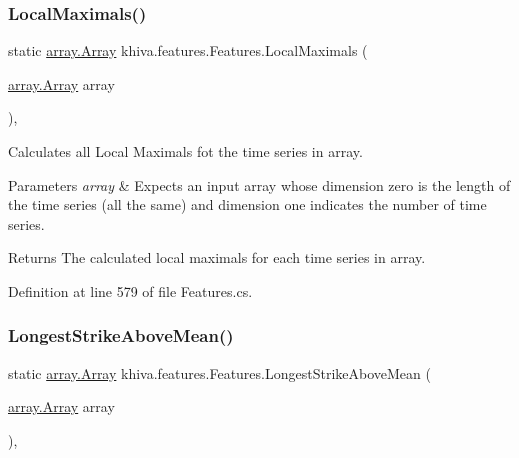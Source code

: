 \mbox{\label{classkhiva_1_1features_1_1_features_aecd48dfe93b9ba4790a53ce80da6b80d}} 
\subsubsection{\texorpdfstring{Local\+Maximals()}{LocalMaximals()}}
{\footnotesize\ttfamily static \mbox{\hyperlink{classkhiva_1_1array_1_1_array}{array.\+Array}} khiva.\+features.\+Features.\+Local\+Maximals (\begin{DoxyParamCaption}\item[{\mbox{\hyperlink{classkhiva_1_1array_1_1_array}{array.\+Array}}}]{array }\end{DoxyParamCaption})\hspace{0.3cm}{\ttfamily [inline]}, {\ttfamily [static]}}



Calculates all Local Maximals fot the time series in array. 


\begin{DoxyParams}{Parameters}
{\em array} & Expects an input array whose dimension zero is the length of the time series (all the same) and dimension one indicates the number of time series.\\
\hline
\end{DoxyParams}
\begin{DoxyReturn}{Returns}
The calculated local maximals for each time series in array.
\end{DoxyReturn}


Definition at line 579 of file Features.\+cs.

\mbox{\label{classkhiva_1_1features_1_1_features_ad57efb15959db76c4e9f7de34b78a7bc}} 
\subsubsection{\texorpdfstring{Longest\+Strike\+Above\+Mean()}{LongestStrikeAboveMean()}}
{\footnotesize\ttfamily static \mbox{\hyperlink{classkhiva_1_1array_1_1_array}{array.\+Array}} khiva.\+features.\+Features.\+Longest\+Strike\+Above\+Mean (\begin{DoxyParamCaption}\item[{\mbox{\hyperlink{classkhiva_1_1array_1_1_array}{array.\+Array}}}]{array }\end{DoxyParamCaption})\hspace{0.3cm}{\ttfamily [inline]}, {\ttfamily [static]}}



